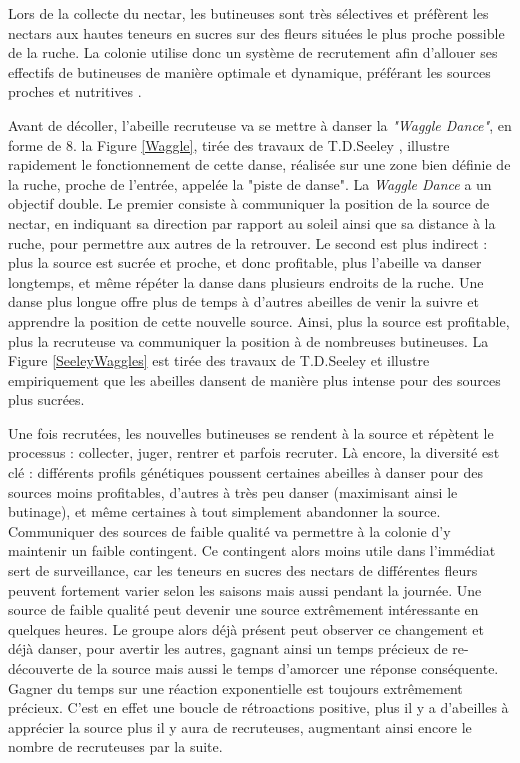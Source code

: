 			
			
			Lors de la collecte du nectar, les butineuses sont très sélectives et préfèrent les nectars aux hautes teneurs en sucres sur des fleurs situées le plus proche possible de la ruche. La colonie utilise donc un système de recrutement afin d'allouer ses effectifs de butineuses de manière optimale et dynamique, préférant les sources proches et nutritives \cite{riviere_modemulti-agent_2021}.
	
	Avant de décoller, l'abeille recruteuse va se mettre à danser la \textit{"Waggle Dance"}, en forme de 8. la Figure \ref{Waggle}, tirée des travaux de T.D.Seeley \cite{seeley_wisdom_1995}, illustre rapidement le fonctionnement de cette danse, réalisée sur une zone bien définie de la ruche, proche de l'entrée, appelée la "piste de danse". La \textit{Waggle Dance} a un objectif double. Le premier consiste à communiquer la position de la source de nectar, en indiquant sa direction par rapport au soleil ainsi que sa distance à la ruche, pour permettre aux autres de la retrouver. Le second est plus indirect : plus la source est sucrée et proche, et donc profitable, plus l'abeille va danser longtemps, et même répéter la danse dans plusieurs endroits de la ruche. Une danse plus longue offre plus de temps à d'autres abeilles de venir la suivre et apprendre la position de cette nouvelle source. Ainsi, plus la source est profitable, plus la recruteuse va communiquer la position à de nombreuses butineuses. La Figure \ref{SeeleyWaggles} est tirée des travaux de T.D.Seeley \cite{seeley_wisdom_1995} et illustre empiriquement que les abeilles dansent de manière plus intense pour des sources plus sucrées.
			
			Une fois recrutées, les nouvelles butineuses se rendent à la source et répètent le processus : collecter, juger, rentrer et parfois recruter. Là encore, la diversité est clé : différents profils génétiques poussent certaines abeilles à danser pour des sources moins profitables, d'autres à très peu danser (maximisant ainsi le butinage), et même certaines à tout simplement abandonner la source. Communiquer des sources de faible qualité va permettre à la colonie d'y maintenir un faible contingent. Ce contingent alors moins utile dans l'immédiat sert de surveillance, car les teneurs en sucres des nectars de différentes fleurs peuvent fortement varier selon les saisons mais aussi pendant la journée. 
			Une source de faible qualité peut devenir une source extrêmement intéressante en quelques heures. Le groupe alors déjà présent peut observer ce changement et déjà danser, pour avertir les autres, gagnant ainsi un temps précieux de re-découverte de la source mais aussi le temps d'amorcer une réponse conséquente. Gagner du temps sur une réaction exponentielle est toujours extrêmement précieux. 
			C'est en effet une boucle de rétroactions positive, plus il y a d'abeilles à apprécier la source plus il y aura de recruteuses, augmentant ainsi encore le nombre de recruteuses par la suite.
			
